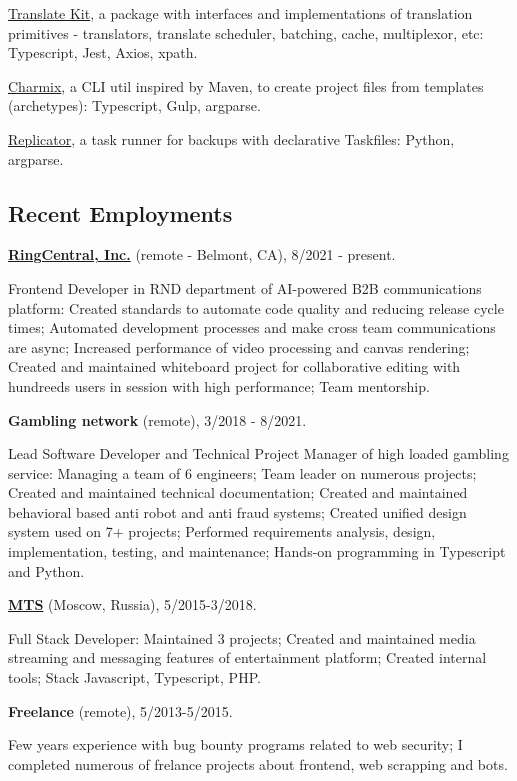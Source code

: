\documentclass{vitonsky}
\begin{document}
\href{https://github.com/translate-tools/core}{Translate Kit}, a package with interfaces and implementations of translation primitives - translators, translate scheduler, batching, cache, multiplexor, etc: Typescript, Jest, Axios, xpath.

\href{https://github.com/vitonsky/charmix}{Charmix}, a CLI util inspired
by Maven, to create project files from templates (archetypes):
Typescript, Gulp, argparse.

\href{https://github.com/vitonsky/replicator}{Replicator}, a task runner
for backups with declarative Taskfiles: Python, argparse.

\subsection*{Recent Employments}

\textbf{\href{https://www.ringcentral.com/}{RingCentral, Inc.}} (remote - Belmont, CA), 8/2021 - present.

Frontend Developer in RND department of AI-powered B2B communications platform: Created standards to automate code quality and reducing release cycle times; Automated development processes and make cross team communications are async; Increased performance of video processing and canvas rendering; Created and maintained whiteboard project for collaborative editing with hundreeds users in session with high performance; Team mentorship.

\textbf{Gambling network} (remote), 3/2018 - 8/2021.

Lead Software Developer and Technical Project Manager of high loaded gambling service: Managing a team of 6 engineers; Team leader on numerous projects; Created and maintained technical documentation; Created and maintained behavioral based anti robot and anti fraud systems; Created unified design system used on 7+ projects; Performed requirements analysis, design, implementation, testing, and maintenance; Hands-on programming in Typescript and Python.

\textbf{\href{https://mts.ru}{MTS}} (Moscow, Russia), 5/2015-3/2018.

Full Stack Developer: Maintained 3 projects; Created and maintained media streaming and messaging features of entertainment platform; Created internal tools; Stack Javascript, Typescript, PHP.

\textbf{Freelance} (remote), 5/2013-5/2015.

Few years experience with bug bounty programs related to web security; I completed numerous of frelance projects about frontend, web scrapping and bots.
\end{document}
